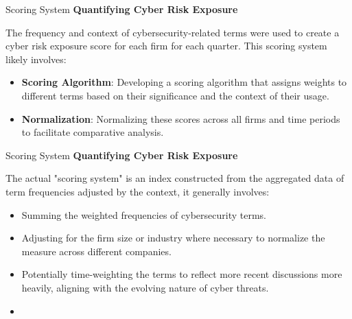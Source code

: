 \documentclass[11pt]{beamer}
\newcommand{\hly}[1]{\colorbox{yellow!100}{#1}}
\begin{document}
\begin{frame}{Scoring System}
\textbf{Quantifying Cyber Risk Exposure}

The \hly{frequency and context of cybersecurity-related terms} were used to create a cyber risk exposure score for each firm for each quarter. This scoring system likely involves:

	\begin{itemize}
		\item \textbf{Scoring Algorithm}: Developing a scoring algorithm that assigns weights to different terms based on their significance and the context of their usage.

		\item \textbf{Normalization}: Normalizing these scores across all firms and time periods to facilitate comparative analysis.
	\end{itemize}
\end{frame}
\begin{frame}{Scoring System}
\textbf{Quantifying Cyber Risk Exposure}

The actual "scoring system" is an index constructed from the aggregated data of term frequencies adjusted by the context, it generally involves:

	\begin{itemize}
		\item Summing the weighted frequencies of cybersecurity terms.

		\item Adjusting for the firm size or industry where necessary to normalize the measure across different companies.

		\item Potentially time-weighting the terms to reflect more recent discussions more heavily, aligning with the evolving nature of cyber threats.

		\item 

	\end{itemize}
\end{frame}
\end{document}
